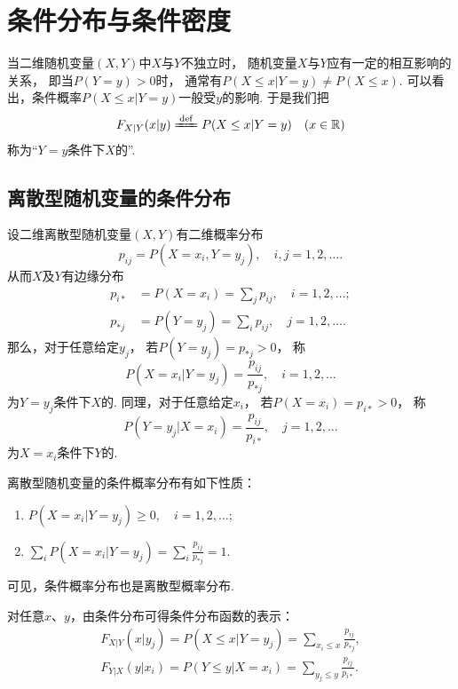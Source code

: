 \section{条件分布与条件密度}
当二维随机变量\((X,Y)\)中\(X\)与\(Y\)不独立时，
随机变量\(X\)与\(Y\)应有一定的相互影响的关系，
即当\(P(Y = y) > 0\)时，
通常有\(P(X \leq x \vert Y = y) \neq P(X \leq x)\).
可以看出，条件概率\(P(X \leq x \vert Y = y)\)一般受\(y\)的影响.
于是我们把\[
	F_{X \vert Y}(x \vert y)
	\defeq
	P(X \leq x \vert Y = y)
	\quad(x\in\mathbb{R})
\]称为“\(Y=y\)条件下\(X\)的”.

\subsection{离散型随机变量的条件分布}
设二维离散型随机变量\((X,Y)\)有二维概率分布\[
	p_{ij} = P(X=x_i,Y=y_j),
	\quad i,j=1,2,\dotsc.
\]
从而\(X\)及\(Y\)有边缘分布\begin{align*}
	p_{i*}
	&= P(X=x_i)
	= \sum_j p_{ij},
	\quad i=1,2,\dotsc; \\
	p_{*j}
	&= P(Y=y_j)
	= \sum_i p_{ij},
	\quad j=1,2,\dotsc.
\end{align*}
那么，对于任意给定\(y_j\)，
若\(P(Y=y_j) = p_{*j} > 0\)，
称\[
	P(X=x_i \vert Y=y_j) = \frac{p_{ij}}{p_{*j}}, \quad i=1,2,\dotsc
\]为\(Y=y_j\)条件下\(X\)的.
同理，对于任意给定\(x_i\)，
若\(P(X=x_i) = p_{i*} > 0\)，
称\[
	P(Y=y_j \vert X=x_i) = \frac{p_{ij}}{p_{i*}}, \quad j=1,2,\dotsc
\]为\(X=x_i\)条件下\(Y\)的.

\begin{property}
离散型随机变量的条件概率分布有如下性质：
\begin{enumerate}
	\item \(P(X=x_i \vert Y=y_j) \geq 0, \quad i=1,2,\dotsc;\)
	\item \(\sum_{i}{P(X=x_i \vert Y=y_j)} = \sum_{i}{\frac{p_{ij}}{p_{*j}}} = 1.\)
\end{enumerate}
可见，条件概率分布也是离散型概率分布.
\end{property}

\begin{theorem}
对任意\(x\)、\(y\)，由条件分布可得条件分布函数的表示：
\begin{align*}
	F_{X \vert Y}(x \vert y_j)
	= P(X \leq x \vert Y=y_j)
	= \sum_{x_i \leq x}{\frac{p_{ij}}{p_{*j}}}, \\
	F_{Y \vert X}(y \vert x_i)
	= P(Y \leq y \vert X=x_i)
	= \sum_{y_j \leq y}{\frac{p_{ij}}{p_{i*}}}.
\end{align*}
\end{theorem}

